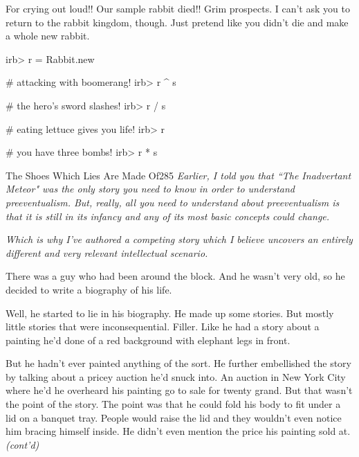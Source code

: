 \documentclass[12pt,twoside]{report}
\begin{document}
For crying out loud!!  Our sample rabbit died!!  Grim prospects.  I
can't ask you to return to the rabbit kingdom, though. Just pretend
like you didn't die and make a whole new rabbit.


\begin{consolecode}

 irb> r = Rabbit.new

 # attacking with boomerang!
 irb> r ^ s

 # the hero's sword slashes!
 irb> r / s

 # eating lettuce gives you life!
 irb> r %

 # you have three bombs!
 irb> r * s

\end{consolecode}


	\begin{sidebar}{The Shoes Which Lies Are Made Of}{285}
		\textit{Earlier, I told you that ``The Inadvertant Meteor" was the only story you need to know in order to understand preeventualism. But, really, all you need to understand about preeventualism is that it is still in its infancy and any of its most basic concepts could change.}\vspace{6pt}
		
		\textit{Which is why I've authored a competing story which I believe uncovers an entirely different and very relevant intellectual scenario.}\vspace{6pt}

		There was a guy who had been around the block. And he wasn't very old, so he decided to write a biography of his life.\vspace{6pt}

		Well, he started to lie in his biography. He made up some stories. But mostly little stories that were inconsequential. Filler. Like he had a story about a painting he'd done of a red background with elephant legs in front.\vspace{6pt}

		But he hadn't ever painted anything of the sort. He further embellished the story by talking about a pricey auction he'd snuck into. An auction in New York City where he'd he overheard his painting go to sale for twenty grand. But that wasn't the point of the story. The point was that he could fold his body to fit under a lid on a banquet tray. People would raise the lid and they wouldn't even notice him bracing himself inside. He didn't even mention the price his painting sold at. \textit{(cont'd)}
	\end{sidebar}
\end{document}

